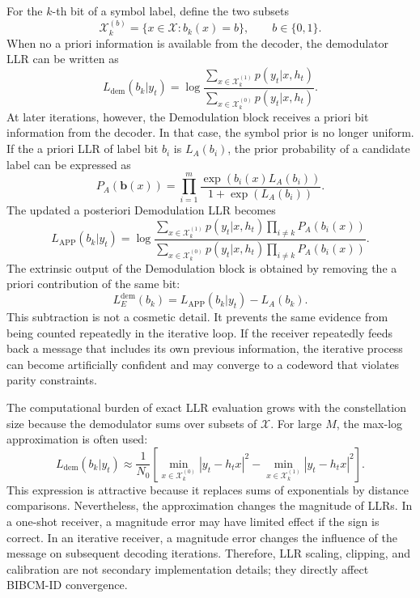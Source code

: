 For the $k$-th bit of a symbol label, define the two subsets
\begin{equation}
  \mathcal{X}_{k}^{(b)}=\{x\in\mathcal{X}: b_k(x)=b\}, \qquad b\in\{0,1\}.
\end{equation}
When no a priori information is available from the decoder, the demodulator LLR can be written as
\begin{equation}
  L_{\mathrm{dem}}(b_k|y_t)
  =\log\frac{\sum_{x\in\mathcal{X}_{k}^{(1)}}p(y_t|x,h_t)}
  {\sum_{x\in\mathcal{X}_{k}^{(0)}}p(y_t|x,h_t)}.
\end{equation}
At later iterations, however, the Demodulation block receives a priori bit information from the decoder. In that case, the symbol prior is no longer uniform. If the a priori LLR of label bit $b_i$ is $L_A(b_i)$, the prior probability of a candidate label can be expressed as
\begin{equation}
  P_A(\mathbf{b}(x))=
  \prod_{i=1}^{m}
  \frac{\exp(b_i(x)L_A(b_i))}
  {1+\exp(L_A(b_i))}.
\end{equation}
The updated a posteriori Demodulation LLR becomes
\begin{equation}
  L_{\mathrm{APP}}(b_k|y_t)
  =
  \log
  \frac{\sum_{x\in\mathcal{X}_{k}^{(1)}}p(y_t|x,h_t)
  \prod_{i\ne k} P_A(b_i(x))}
  {\sum_{x\in\mathcal{X}_{k}^{(0)}}p(y_t|x,h_t)
  \prod_{i\ne k} P_A(b_i(x))}.
\end{equation}
The extrinsic output of the Demodulation block is obtained by removing the a priori contribution of the same bit:
\begin{equation}
  L_E^{\mathrm{dem}}(b_k)=L_{\mathrm{APP}}(b_k|y_t)-L_A(b_k).
\end{equation}
This subtraction is not a cosmetic detail. It prevents the same evidence from being counted repeatedly in the iterative loop. If the receiver repeatedly feeds back a message that includes its own previous information, the iterative process can become artificially confident and may converge to a codeword that violates parity constraints.

The computational burden of exact LLR evaluation grows with the constellation size because the demodulator sums over subsets of $\mathcal{X}$. For large $M$, the max-log approximation is often used:
\begin{equation}
  L_{\mathrm{dem}}(b_k|y_t)
  \approx
  \frac{1}{N_0}
  \left[
  \min_{x\in\mathcal{X}_{k}^{(0)}}|y_t-h_t x|^2
  -
  \min_{x\in\mathcal{X}_{k}^{(1)}}|y_t-h_t x|^2
  \right].
\end{equation}
This expression is attractive because it replaces sums of exponentials by distance comparisons. Nevertheless, the approximation changes the magnitude of LLRs. In a one-shot receiver, a magnitude error may have limited effect if the sign is correct. In an iterative receiver, a magnitude error changes the influence of the message on subsequent decoding iterations. Therefore, LLR scaling, clipping, and calibration are not secondary implementation details; they directly affect BIBCM-ID convergence.

